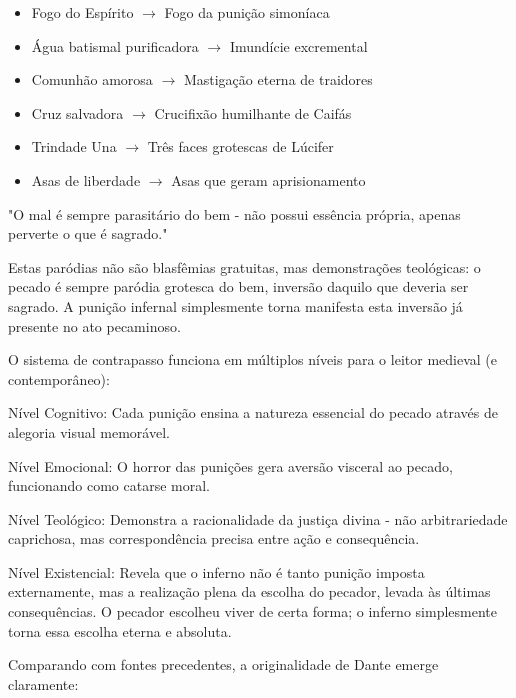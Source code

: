 \begin{itemize}
 \item Fogo do Espírito $\rightarrow$ Fogo da punição simoníaca
 \item Água batismal purificadora $\rightarrow$ Imundície excremental
 \item Comunhão amorosa $\rightarrow$ Mastigação eterna de traidores
 \item Cruz salvadora $\rightarrow$ Crucifixão humilhante de Caifás
 \item Trindade Una $\rightarrow$ Três faces grotescas de Lúcifer
 \item Asas de liberdade $\rightarrow$ Asas que geram aprisionamento
\end{itemize}
"O mal é sempre parasitário do bem - não possui essência própria, apenas perverte o que é sagrado."

Estas paródias não são blasfêmias gratuitas, mas demonstrações teológicas: o pecado é sempre paródia grotesca do bem, inversão daquilo que deveria ser sagrado. A punição infernal simplesmente torna manifesta esta inversão já presente no ato pecaminoso.

O sistema de contrapasso funciona em múltiplos níveis para o leitor medieval (e contemporâneo):

Nível Cognitivo: Cada punição ensina a natureza essencial do pecado através de alegoria visual memorável.

Nível Emocional: O horror das punições gera aversão visceral ao pecado, funcionando como catarse moral.

Nível Teológico: Demonstra a racionalidade da justiça divina - não arbitrariedade caprichosa, mas correspondência precisa entre ação e consequência.

Nível Existencial: Revela que o inferno não é tanto punição imposta externamente, mas a realização plena da escolha do pecador, levada às últimas consequências. O pecador escolheu viver de certa forma; o inferno simplesmente torna essa escolha eterna e absoluta.

Comparando com fontes precedentes, a originalidade de Dante emerge claramente:

